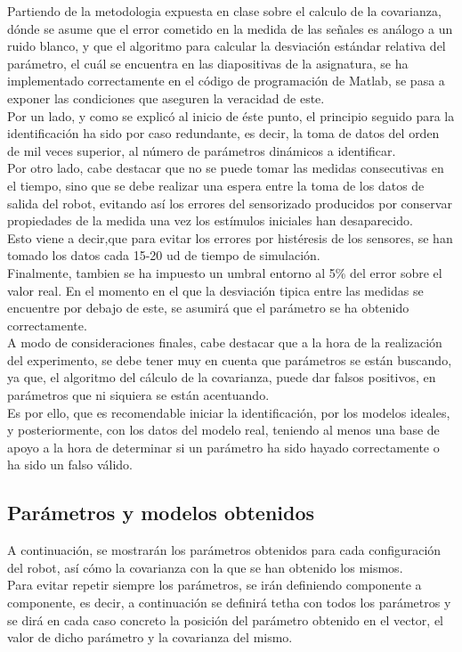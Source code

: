 \newpage
Partiendo de la metodologia expuesta en clase sobre el calculo de la covarianza, dónde se asume que el error cometido en la medida de las señales es análogo a un ruido blanco, y que el algoritmo para calcular la desviación estándar relativa del parámetro, el cuál se encuentra en las diapositivas de la asignatura, se ha implementado correctamente en el código de programación de Matlab, se pasa a exponer las condiciones que aseguren la veracidad de este. \\
Por un lado, y como se explicó al inicio de éste punto, el principio seguido para la identificación ha sido por caso redundante, es decir, la toma de datos del orden de mil veces superior, al número de parámetros dinámicos a identificar.\\
Por otro lado, cabe destacar que no se puede tomar las medidas consecutivas en el tiempo, sino que se debe realizar una espera entre la toma de los datos de salida del robot, evitando así los errores del sensorizado producidos por conservar propiedades de la medida una vez los estímulos iniciales han desaparecido.\\
Esto viene a decir,que para evitar los errores por histéresis de los sensores, se han tomado los datos cada 15-20 ud de tiempo de simulación.\\
Finalmente, tambien se ha impuesto un umbral entorno al 5\% del error sobre el valor real. En el momento en el que la desviación tipica entre las medidas se encuentre por debajo de este, se asumirá que el parámetro se ha obtenido correctamente.\\

A modo de consideraciones finales, cabe destacar que a la hora de la realización del experimento, se debe tener muy en cuenta que parámetros se están buscando, ya que,	el algoritmo del cálculo de la covarianza, puede dar falsos positivos, en  parámetros que ni siquiera se están acentuando.\\

Es por ello, que es recomendable iniciar la identificación, por los modelos ideales, y posteriormente, con los datos del modelo real, teniendo al menos una base de apoyo a la hora de determinar si un parámetro ha sido hayado correctamente o ha sido un falso válido.

	\subsection{Parámetros y modelos obtenidos}
	A continuación, se mostrarán los parámetros obtenidos para cada configuración del robot, así cómo la covarianza con la que se han obtenido los mismos.\\
	Para evitar repetir siempre los parámetros, se irán definiendo componente a componente, es decir, a continuación se definirá tetha con todos los parámetros y se dirá en cada caso concreto la posición del parámetro obtenido en el vector, el valor de dicho parámetro y la covarianza del mismo. \\

